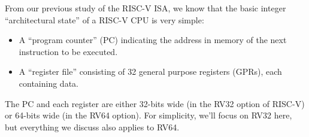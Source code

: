 \label{Sec_ISA_Exec_Algorithm}


From our previous study of the RISC-V ISA, we know that the basic
integer ``architectural state'' of a RISC-V CPU is very simple:

\begin{itemize}

\item A ``program counter'' (PC) indicating the address in memory of
the next instruction to be executed.

\item A ``register file'' consisting of 32 general purpose registers
(GPRs), each containing data.

\end{itemize}

The PC and each register are either 32-bits wide (in the RV32 option
of RISC-V) or 64-bits wide (in the RV64 option).  For simplicity,
we'll focus on RV32 here, but everything we discuss also applies to
RV64.

